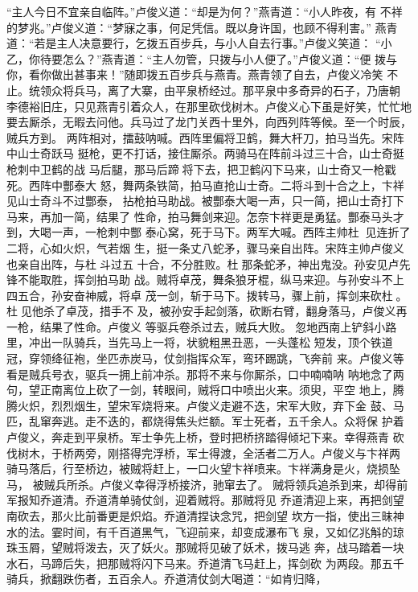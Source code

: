“主人今日不宜亲自临阵。”卢俊义道：“却是为何？”燕青道：“小人昨夜，有
不祥的梦兆。”卢俊义道：“梦寐之事，何足凭信。既以身许国，也顾不得利害。”
燕青道：“若是主人决意要行，乞拨五百步兵，与小人自去行事。”卢俊义笑道：
“小乙，你待要怎么？”燕青道：“主人勿管，只拨与小人便了。”卢俊义道：“便
拨与你，看你做出甚事来！”随即拨五百步兵与燕青。燕青领了自去，卢俊义冷笑
不止。统领众将兵马，离了大寨，由平泉桥经过。那平泉中多奇异的石子，乃唐朝
李德裕旧庄，只见燕青引着众人，在那里砍伐树木。卢俊义心下虽是好笑，忙忙地
要去厮杀，无暇去问他。兵马过了龙门关西十里外，向西列阵等候。至一个时辰，
贼兵方到。
两阵相对，擂鼓呐喊。西阵里偏将卫鹤，舞大杆刀，拍马当先。宋阵中山士奇跃马
挺枪，更不打话，接住厮杀。两骑马在阵前斗过三十合，山士奇挺枪刺中卫鹤的战
马后腿，那马后蹄将下去，把卫鹤闪下马来，山士奇又一枪戳死。西阵中酆泰大
怒，舞两条铁简，拍马直抢山士奇。二将斗到十合之上，卞祥见山士奇斗不过酆泰，
拈枪拍马助战。被酆泰大喝一声，只一简，把山士奇打下马来，再加一简，结果了
性命，拍马舞剑来迎。怎奈卞祥更是勇猛。酆泰马头才到，大喝一声，一枪刺中酆
泰心窝，死于马下。两军大喊。西阵主帅杜，见连折了二将，心如火炽，气若烟
生，挺一条丈八蛇矛，骤马亲自出阵。宋阵主帅卢俊义也亲自出阵，与杜斗过五
十合，不分胜败。杜那条蛇矛，神出鬼没。孙安见卢先锋不能取胜，挥剑拍马助
战。贼将卓茂，舞条狼牙棍，纵马来迎。与孙安斗不上四五合，孙安奋神威，将卓
茂一剑，斩于马下。拨转马，骤上前，挥剑来砍杜。杜见他杀了卓茂，措手不
及，被孙安手起剑落，砍断右臂，翻身落马，卢俊义再一枪，结果了性命。卢俊义
等驱兵卷杀过去，贼兵大败。
忽地西南上铲斜小路里，冲出一队骑兵，当先马上一将，状貌粗黑丑恶，一头蓬松
短发，顶个铁道冠，穿领绛征袍，坐匹赤炭马，仗剑指挥众军，弯环踢跳，飞奔前
来。卢俊义等看是贼兵号衣，驱兵一拥上前冲杀。那将不来与你厮杀，口中喃喃呐
呐地念了两句，望正南离位上砍了一剑，转眼间，贼将口中喷出火来。须臾，平空
地上，腾腾火炽，烈烈烟生，望宋军烧将来。卢俊义走避不迭，宋军大败，弃下金
鼓、马匹，乱窜奔逃。走不迭的，都烧得焦头烂额。军士死者，五千余人。众将保
护着卢俊义，奔走到平泉桥。军士争先上桥，登时把桥挤踏得倾圮下来。幸得燕青
砍伐树木，于桥两旁，刚搭得完浮桥，军士得渡，全活者二万人。卢俊义与卞祥两
骑马落后，行至桥边，被贼将赶上，一口火望卞祥喷来。卞祥满身是火，烧损坠马，
被贼兵所杀。卢俊义幸得浮桥接济，驰窜去了。
贼将领兵追杀到来，却得前军报知乔道清。乔道清单骑仗剑，迎着贼将。那贼将见
乔道清迎上来，再把剑望南砍去，那火比前番更是炽焰。乔道清捏诀念咒，把剑望
坎方一指，使出三昧神水的法。霎时间，有千百道黑气，飞迎前来，却变成瀑布飞
泉，又如亿兆斛的琼珠玉屑，望贼将泼去，灭了妖火。那贼将见破了妖术，拨马逃
奔，战马踏着一块水石，马蹄后失，把那贼将闪下马来。乔道清飞马赶上，挥剑砍
为两段。那五千骑兵，掀翻跌伤者，五百余人。乔道清仗剑大喝道：“如肯归降，
